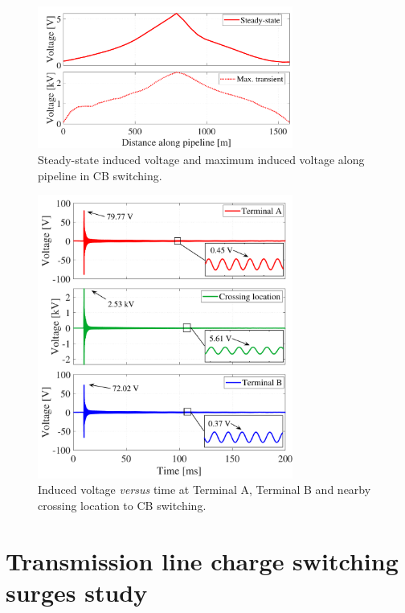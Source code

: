 \documentclass[5p,twocolumn]{elsarticle}
\begin{document}
\begin{figure}[h]
	\begin{center}
		\includegraphics[width=8.4cm]{img/CBindVoltage.pdf}    %
		\caption{Steady-state induced voltage and maximum induced voltage along pipeline in CB switching.} 
		\label{fig:CBindVoltage}
	\end{center}
\end{figure}

\begin{figure}[H]
	\begin{center}
		\includegraphics[width=8.4cm]{img/CBindVoltage_3plots.pdf}    %
		\caption{Induced voltage \textit{versus} time at Terminal A, Terminal B and nearby crossing location to CB switching.} 
		\label{fig:CBindVoltage3plots}
	\end{center}
\end{figure}

\section{Transmission line charge switching surges study}
\end{document}
